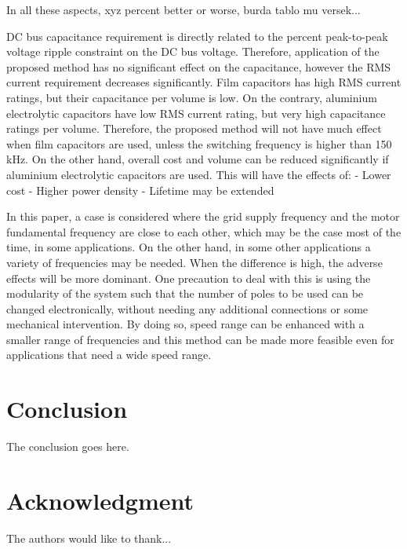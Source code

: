 \documentclass[conference,a4paper,twocolumn]{IEEEtran}
\begin{document}
In all these aspects, xyz percent better or worse, burda tablo mu versek...

DC bus capacitance requirement is directly related to the percent peak-to-peak voltage ripple constraint on the DC bus voltage. Therefore, application of the proposed method has no significant effect on the capacitance, however the RMS current requirement decreases significantly.
Film capacitors has high RMS current ratings, but their capacitance per volume is low. On the contrary, aluminium electrolytic capacitors have low RMS current rating, but very high capacitance ratings per volume. Therefore, the proposed method will not have much effect when film capacitors are used, unless the switching frequency is higher than 150 kHz. On the other hand, overall cost and volume can be reduced significantly if aluminium electrolytic capacitors are used.
This will have the effects of:
- Lower cost
- Higher power density
- Lifetime may be extended

In this paper, a case is considered where the grid supply frequency and the motor fundamental frequency are close to each other, which may be the case most of the time, in some applications. On the other hand, in some other applications a variety of frequencies may be needed. When the difference is high, the adverse effects will be more dominant. One precaution to deal with this is using the modularity of the system such that the number of poles to be used can be changed electronically, without needing any additional connections or some mechanical intervention. By doing so, speed range can be enhanced with a smaller range of frequencies and this method can be made more feasible even for applications that need a wide speed range.


\section{Conclusion}
The conclusion goes here.


\section*{Acknowledgment}

The authors would like to thank...



\end{document}

